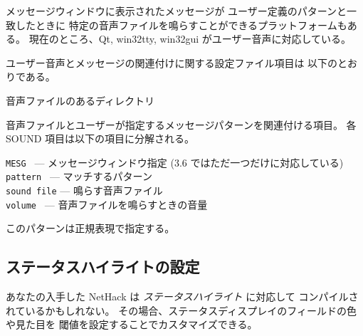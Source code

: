 メッセージウィンドウに表示されたメッセージが
ユーザー定義のパターンと一致したときに
特定の音声ファイルを鳴らすことができるプラットフォームもある。
現在のところ、Qt, win32tty, win32gui がユーザー音声に対応している。

ユーザー音声とメッセージの関連付けに関する設定ファイル項目は
以下のとおりである。

\blist{}
\item[\ib{SOUNDDIR}]
音声ファイルのあるディレクトリ
\item[\ib{SOUND}]
音声ファイルとユーザーが指定するメッセージパターンを関連付ける項目。
各 SOUND 項目は以下の項目に分解される。

{\tt MESG      } --- メッセージウィンドウ指定 (3.6 ではただ一つだけに対応している)\\
{\tt pattern   } --- マッチするパターン\\
{\tt sound file} --- 鳴らす音声ファイル\\
{\tt volume    } --- 音声ファイルを鳴らすときの音量
\elist

このパターンは正規表現で指定する。

\subsection*{ステータスハイライトの設定}

あなたの入手した NetHack は {\it ステータスハイライト} に対応して
コンパイルされているかもしれない。
その場合、ステータスディスプレイのフィールドの色や見た目を
閾値を設定することでカスタマイズできる。

